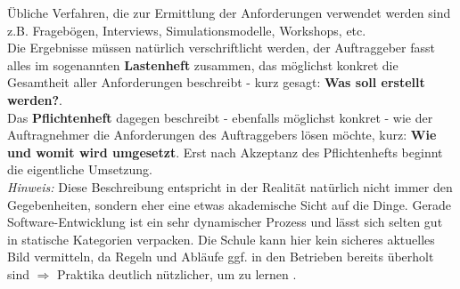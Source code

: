 \documentclass{article}
\begin{document}
Übliche Verfahren, die zur Ermittlung der Anforderungen verwendet werden sind z.B. Fragebögen, Interviews, Simulationsmodelle, Workshops, etc.  \\
Die Ergebnisse müssen natürlich verschriftlicht werden, der Auftraggeber fasst alles im sogenannten \textbf{Lastenheft} zusammen, das möglichst konkret die Gesamtheit aller Anforderungen beschreibt - kurz gesagt: \textbf{Was soll erstellt werden?}. \\
Das \textbf{Pflichtenheft} dagegen beschreibt - ebenfalls möglichst konkret - wie der Auftragnehmer die Anforderungen des Auftraggebers lösen möchte, kurz: \textbf{Wie und womit wird umgesetzt}. Erst nach Akzeptanz des Pflichtenhefts beginnt die eigentliche Umsetzung. \\
\textit{Hinweis:} Diese Beschreibung entspricht in der Realität natürlich nicht immer den Gegebenheiten, sondern eher eine etwas akademische Sicht auf die Dinge. Gerade Software-Entwicklung ist ein sehr dynamischer Prozess und lässt sich selten gut in statische Kategorien verpacken. Die Schule kann hier kein sicheres aktuelles Bild vermitteln, da Regeln und Abläufe ggf. in den Betrieben bereits überholt sind $\Rightarrow$ Praktika deutlich nützlicher, um zu lernen . \vspace{3mm} \\
\end{document}
